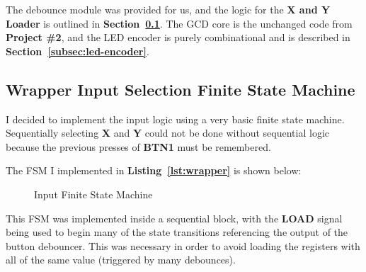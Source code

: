 \documentclass[a4paper, 12pt]{article}
\begin{document}
The debounce module was provided for us, and the logic for the \textbf{X and Y Loader} is outlined in \textbf{Section~\ref{subsec:wrapper-fsm}}. The GCD core is the unchanged code from \textbf{Project \#2}, and the LED encoder is purely combinational and is described in \textbf{Section~\ref{subsec:led-encoder}}.

\subsection{Wrapper Input Selection Finite State Machine}
\label{subsec:wrapper-fsm}
I decided to implement the input logic using a very basic finite state machine. Sequentially selecting \textbf{X} and \textbf{Y} could not be done without sequential logic because the previous presses of \textbf{BTN1} must be remembered. 

The FSM I implemented in \textbf{Listing~\ref{lst:wrapper}} is shown below:

\begin{figure}[H]
\centering
{}
\caption{Input Finite State Machine}
\label{fig:fsm}
\end{figure}

This FSM was implemented inside a sequential block, with the \textbf{LOAD} signal being used to begin many of the state transitions referencing the output of the button debouncer. This was necessary in order to avoid loading the registers with all of the same value (triggered by many debounces).
\end{document}
